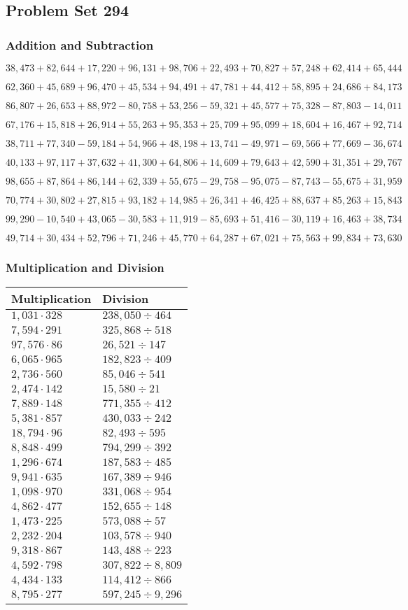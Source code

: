 \hypertarget{problem-set-294}{%
\subsection{Problem Set 294}\label{problem-set-294}}

\hypertarget{addition-and-subtraction}{%
\subsubsection{Addition and
Subtraction}\label{addition-and-subtraction}}

\(38,473+82,644+17,220+96,131+98,706+22,493+70,827+57,248+62,414+65,444\)

\(62,360+45,689+96,470+45,534+94,491+47,781+44,412+58,895+24,686+84,173\)

\(86,807+26,653+88,972-80,758+53,256-59,321+45,577+75,328-87,803-14,011\)

\(67,176+15,818+26,914+55,263+95,353+25,709+95,099+18,604+16,467+92,714\)

\(38,711+77,340-59,184+54,966+48,198+13,741-49,971-69,566+77,669-36,674\)

\(40,133+97,117+37,632+41,300+64,806+14,609+79,643+42,590+31,351+29,767\)

\(98,655+87,864+86,144+62,339+55,675-29,758-95,075-87,743-55,675+31,959\)

\(70,774+30,802+27,815+93,182+14,985+26,341+46,425+88,637+85,263+15,843\)

\(99,290-10,540+43,065-30,583+11,919-85,693+51,416-30,119+16,463+38,734\)

\(49,714+30,434+52,796+71,246+45,770+64,287+67,021+75,563+99,834+73,630\)

\hypertarget{multiplication-and-division}{%
\subsubsection{Multiplication and
Division}\label{multiplication-and-division}}

\begin{longtable}[]{@{}ll@{}}
\toprule
Multiplication & Division\tabularnewline
\midrule
\endhead
\(1,031\cdot328\) & \(238,050÷464\)\tabularnewline
\(7,594\cdot291\) & \(325,868 ÷518\)\tabularnewline
\(97,576\cdot86\) & \(26,521÷147\)\tabularnewline
\(6,065\cdot965\) & \(182,823÷409\)\tabularnewline
\(2,736\cdot560\) & \(85,046÷541\)\tabularnewline
\(2,474\cdot142\) & \(15,580÷21\)\tabularnewline
\(7,889\cdot148\) & \(771,355÷412\)\tabularnewline
\(5,381\cdot857\) & \(430,033÷242\)\tabularnewline
\(18,794\cdot96\) & \(82,493÷595\)\tabularnewline
\(8,848\cdot499\) & \(794,299÷392\)\tabularnewline
\(1,296\cdot674\) & \(187,583÷485\)\tabularnewline
\(9,941\cdot635\) & \(167,389÷946\)\tabularnewline
\(1,098\cdot970\) & \(331,068÷954\)\tabularnewline
\(4,862\cdot477\) & \(152,655÷148\)\tabularnewline
\(1,473\cdot225\) & \(573,088÷57\)\tabularnewline
\(2,232\cdot204\) & \(103,578÷940\)\tabularnewline
\(9,318\cdot867\) & \(143,488÷223\)\tabularnewline
\(4,592\cdot798\) & \(307,822÷8,809\)\tabularnewline
\(4,434\cdot133\) & \(114,412÷866\)\tabularnewline
\(8,795\cdot277\) & \(597,245÷9,296\)\tabularnewline
\bottomrule
\end{longtable}

